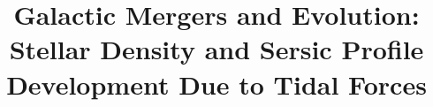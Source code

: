 \documentclass[linenumbers,trackchanges]{aastex7}
\begin{document}
\title{Galactic Mergers and Evolution: Stellar Density and Sersic Profile Development Due to Tidal Forces}

\end{document}
